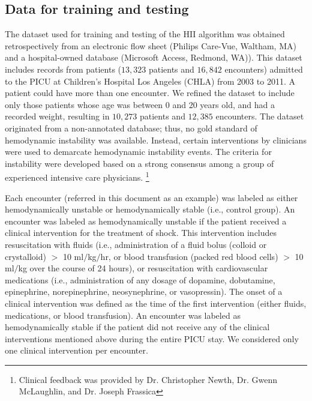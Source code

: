 \documentclass[
   technote
]{phildoc}
\newcommand{\ie}{i.e.,}
\newcommand{\hii}{HII}
\begin{document}
\subsection{Data for training and testing}
The dataset used for training and testing of the \hii{} algorithm was obtained retrospectively from an electronic flow sheet (Philips Care-Vue, Waltham, MA) and a hospital-owned database (Microsoft Access, Redmond, WA)). This dataset includes records from patients ($13,323$ patients and $16,842$ encounters) admitted to the PICU at Children's Hospital Los Angeles (CHLA) from 2003 to 2011. A patient could have more than one encounter. We refined the dataset to include only those patients whose age was between 0 and 20 years old, and had a recorded weight, resulting in $10,273$ patients and $12,385$ encounters. The dataset originated from a non-annotated database; thus, no gold standard of hemodynamic instability was available. Instead, certain interventions by clinicians were used to demarcate hemodynamic instability events. The criteria for instability were developed based on a strong consensus among a group of experienced intensive care physicians. \footnote{Clinical feedback was provided by Dr. Christopher Newth, Dr. Gwenn McLaughlin, and Dr. Joseph Frassica}

Each encounter (referred in this document as an example) was labeled as either hemodynamically unstable or hemodynamically stable (\ie{} control group). An encounter was labeled as hemodynamically unstable if the patient received a clinical intervention for the treatment of shock. This intervention includes resuscitation with fluids (\ie{} administration of a fluid bolus (colloid or crystalloid) $>$ 10 ml$/$kg$/$hr, or blood transfusion (packed red blood cells) $>$ 10 ml$/$kg over the course of 24 hours), or resuscitation with cardiovascular medications (\ie{} administration of any dosage of dopamine, dobutamine, epinephrine, norepinephrine, neosynephrine, or vasopressin). The onset of a clinical intervention was defined as the time of the first intervention (either fluids, medications, or blood transfusion). An encounter was labeled as hemodynamically stable if the patient did not receive any of the clinical interventions mentioned above during the entire PICU stay. We considered only one clinical intervention per encounter. 
\end{document}
